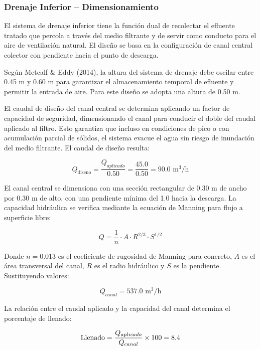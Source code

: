 \documentclass[12pt,a4paper]{article}
\begin{document}
\subsubsection{Drenaje Inferior -- Dimensionamiento}

El sistema de drenaje inferior tiene la función dual de recolectar el efluente tratado que percola a través del medio filtrante y de servir como conducto para el aire de ventilación natural. El diseño se basa en la configuración de canal central colector con pendiente hacia el punto de descarga.

Según Metcalf \& Eddy (2014), la altura del sistema de drenaje debe oscilar entre 0.45 m y 0.60 m para garantizar el almacenamiento temporal de efluente y permitir la entrada de aire. Para este diseño se adopta una altura de 0.50 m.

El caudal de diseño del canal central se determina aplicando un factor de capacidad de seguridad, dimensionando el canal para conducir el doble del caudal aplicado al filtro. Esto garantiza que incluso en condiciones de pico o con acumulación parcial de sólidos, el sistema evacue el agua sin riesgo de inundación del medio filtrante. El caudal de diseño resulta:

\begin{equation}
Q_{\text{diseno}} = \frac{Q_{aplicado}}{0.50} = \frac{45.0}{0.50} = 90.0 \text{ m}^3\text{/h}
\end{equation}

El canal central se dimensiona con una sección rectangular de 0.30 m de ancho por 0.30 m de alto, con una pendiente mínima del 1.0 hacia la descarga. La capacidad hidráulica se verifica mediante la ecuación de Manning para flujo a superficie libre:

\begin{equation}
Q = \frac{1}{n} \cdot A \cdot R^{2/3} \cdot S^{1/2}
\end{equation}

Donde $n = 0.013$ es el coeficiente de rugosidad de Manning para concreto, $A$ es el área transversal del canal, $R$ es el radio hidráulico y $S$ es la pendiente. Sustituyendo valores:

\begin{equation}
Q_{canal} = 537.0 \text{ m}^3\text{/h}
\end{equation}

La relación entre el caudal aplicado y la capacidad del canal determina el porcentaje de llenado:

\begin{equation}
\text{Llenado} = \frac{Q_{aplicado}}{Q_{canal}} \times 100 = 8.4\\%
\end{equation}
\end{document}
